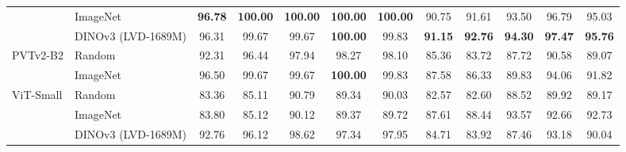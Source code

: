 \begin{table}[htbp]
\begin{tabular*}{\textwidth}{@{\extracolsep{\fill}}ll*{10}{c}@{}}
         & ImageNet & \textbf{96.78} & \textbf{100.00} & \textbf{100.00} & \textbf{100.00} & \textbf{100.00} & 90.75 & 91.61 & 93.50 & 96.79 & 95.03 \\
         & DINOv3 (LVD-1689M) & 96.31 & 99.67 & 99.67 & \textbf{100.00} & 99.83 & \textbf{91.15} & \textbf{92.76} & \textbf{94.30} & \textbf{97.47} & \textbf{95.76} \\
        \addlinespace[1pt]
        PVTv2-B2 & Random & 92.31 & 96.44 & 97.94 & 98.27 & 98.10 & 85.36 & 83.72 & 87.72 & 90.58 & 89.07 \\
         & ImageNet & 96.50 & 99.67 & 99.67 & \textbf{100.00} & 99.83 & 87.58 & 86.33 & 89.83 & 94.06 & 91.82 \\
        \addlinespace[1pt]
        ViT-Small & Random & 83.36 & 85.11 & 90.79 & 89.34 & 90.03 & 82.57 & 82.60 & 88.52 & 89.92 & 89.17 \\
         & ImageNet & 83.80 & 85.12 & 90.12 & 89.37 & 89.72 & 87.61 & 88.44 & 93.57 & 92.66 & 92.73 \\
         & DINOv3 (LVD-1689M) & 92.76 & 96.12 & 98.62 & 97.34 & 97.95 & 84.71 & 83.92 & 87.46 & 93.18 & 90.04 \\
        \bottomrule
    \end{tabular*}
\end{table}

